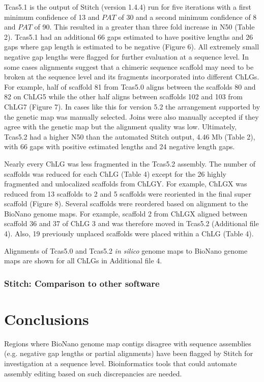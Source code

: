 \documentclass{bmcart}
\begin{document}
Tcas5.1 is the output of Stitch (version 1.4.4) run for five iterations with a first minimum confidence of 13 and $PAT$ of 30 and a second minimum confidence of 8 and $PAT$ of 90. This resulted in a greater than three fold increase in N50 (Table 2). Tcas5.1 had an additional 66 gaps estimated to have positive lengths and 26 gaps where gap length is estimated to be negative (Figure 6). All extremely small negative gap lengths were flagged for further evaluation at a sequence level. In some cases alignments suggest that a chimeric sequence scaffold may need to be broken at the sequence level and its fragments incorporated into different ChLGs. For example, half of scaffold 81 from Tcas5.0 aligns between the scaffolds 80 and 82 on ChLG5 while the other half aligns between scaffolds 102 and 103 from ChLG7 (Figure 7). In cases like this for version 5.2 the arrangement supported by the genetic map was manually selected. Joins were also manually accepted if they agree with the genetic map but the alignment quality was low. Ultimately, Tcas5.2 had a higher N50 than the automated Stitch output, 4.46 Mb (Table 2), with 66 gaps with positive estimated lengths and 24 negative length gaps. 

Nearly every ChLG was less fragmented in the Tcas5.2 assembly. The number of scaffolds was reduced for each ChLG (Table 4) except for the 26 highly fragmented and unlocalized scaffolds from ChLGY. For example, ChLGX was reduced from 13 scaffolds to 2 and 5 scaffolds were reoriented in the final super scaffold (Figure 8). Several scaffolds were reordered based on alignment to the BioNano genome maps. For example, scaffold 2 from ChLGX aligned between scaffold 36 and 37 of ChLG 3 and was therefore moved in Tcas5.2 (Additional file 4). Also, 19 previously unplaced scaffolds were placed within a ChLG (Table 4). 
 
Alignments of Tcas5.0 and Tcas5.2 \textit{in silico} genome maps to BioNano genome maps are shown for all ChLGs in Additional file 4.

\subsubsection*{Stitch: Comparison to other software}

\section*{Conclusions}

Regions where BioNano genome map contigs disagree with sequence assemblies (e.g. negative gap lengths or partial alignments) have been flagged by Stitch for investigation at a sequence level. Bioinformatics tools that could automate assembly editing based on such discrepancies are needed. 
\end{document}
